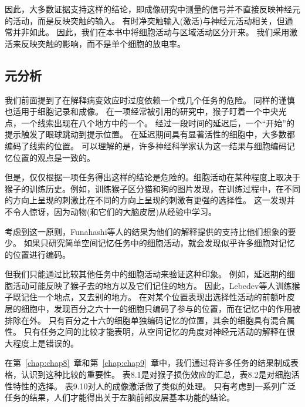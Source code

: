 \par
因此，大多数证据支持这样的结论，即成像研究中测量的信号并不直接反映神经元的活动，而是反映突触的输入。
有时净突触输入(激活)与神经元活动相关，但通常并非如此。
因此，我们在本书中将细胞活动与区域活动区分开来。
我们采用激活来反映突触的影响，而不是单个细胞的放电率\cite{logothetis2002neural}。


\subsection{元分析}

我们前面提到了在解释病变效应时过度依赖一个或几个任务的危险。
同样的谨慎也适用于细胞记录和成像。
在一项经常被引用的研究中\cite{funahashi1989mnemonic}，猴子盯着一个中央光点，一个线索出现在八个地方中的一个。
经过一段时间的延迟后，一个“开始”的提示触发了眼球跳动到提示位置。
在延迟期间具有显著活性的细胞中，大多数都编码了线索的位置。
可以理解的是，许多神经科学家认为这一结果与细胞编码记忆位置的观点是一致的。


\par
但是，仅仅根据一项任务得出这样的结论是危险的。细胞活动在某种程度上取决于猴子的训练历史。例如，训练猴子区分猫和狗的图片发现\cite{freedman2006experience}，在训练过程中，在不同的方向上呈现的刺激比在不同的方向上呈现的刺激有更强的选择性。
这一发现并不令人惊讶，因为动物(和它们的大脑皮层)从经验中学习。


\par
考虑到这一原则，Funahashi等人\cite{funahashi1989mnemonic}的结果为他们的解释提供的支持比他们想象的要少。
如果只研究简单空间记忆任务中的细胞活动，就会发现似乎许多细胞对记忆的位置进行编码。


\par
但我们只能通过比较其他任务中的细胞活动来验证这种印象。
例如，延迟期的细胞活动可能反映了猴子去的地方以及它们记住的地方。
因此，Lebedev等人\cite{lebedev2004representation}训练猴子既记住一个地点，又去别的地方。
在对某个位置表现出选择性活动的前额叶皮层的细胞中，发现百分之六十一的细胞只编码了参与的位置，而在记忆中的作用被排除在外。
只有百分之十六的细胞单独编码记忆的位置，其余的细胞具有混合属性。
只有任务之间的比较才能表明，从空间记忆的角度对神经元活动的解释在很大程度上是错误的。


\par
在第~\ref{chap:chap8}~章和第~\ref{chap:chap9}~章中，我们通过将许多任务的结果制成表格，认识到这种比较的重要性。
表8.1是对猴子损伤效应的汇总，表8.2是对细胞活性特性的选择。
表9.10对人的成像激活做了类似的处理。
只有考虑到一系列广泛任务的结果，人们才能得出关于左脑前部皮层基本功能的结论。


